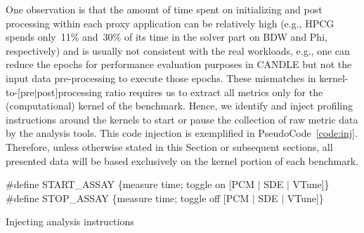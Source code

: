 One observation is that the amount of time spent on initializing and post processing within
each proxy application can be relatively high (e.g., HPCG spends only~11\% and~30\% of its
time in the solver part on BDW and Phi, respectively) and is usually not consistent with the real workloads, e.g., one can
reduce the epochs for performance evaluation purposes in CANDLE but not the input data
pre-processing to execute those epochs. These mismatches in kernel-to-[pre$|$post]processing ratio
requires us to extract all metrics only for the (computational) kernel of the benchmark.
Hence, we identify and inject profiling instructions around the kernels to start or pause the
collection of raw metric data by the analysis tools. This code injection is exemplified in
PseudoCode~\ref{code:inj}. Therefore, unless otherwise stated in this Section or subsequent sections,
all presented data will be based exclusively on the kernel portion of each benchmark.
%
\begin{algorithm}[tbp]
    \label{code:inj}
    \#define START\_ASSAY \{measure time; toggle on [PCM $|$ SDE $|$ VTune]\} \;
    \#define STOP\_ASSAY \{measure time; toggle off [PCM $|$ SDE $|$ VTune]\} \;
    \caption{Injecting analysis instructions}
    \vspace{-.5em}
\end{algorithm}


